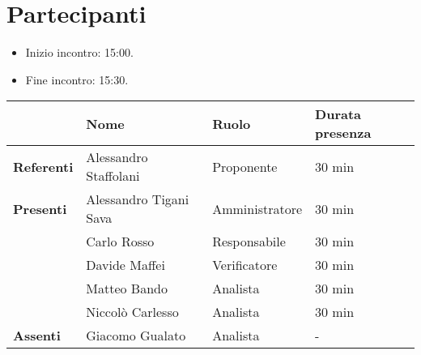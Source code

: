 \section*{Partecipanti}

\begin{itemize}
	\item Inizio incontro: 15:00.
	\item Fine incontro: 15:30.
\end{itemize}


\begin{center}
	{\renewcommand{\arraystretch}{1.5}
		\begin{tabular}{l|lll}
			                   & \textbf{Nome}          & \textbf{Ruolo} & \textbf{Durata presenza} \\
			\hline
			\textbf{Referenti} & Alessandro Staffolani  & Proponente     & 30 min                   \\
			\hline
			\textbf{Presenti}  & Alessandro Tigani Sava & Amministratore & 30 min                   \\
			                   & Carlo Rosso            & Responsabile   & 30 min                   \\
			                   & Davide Maffei          & Verificatore   & 30 min                   \\
			                   & Matteo Bando           & Analista       & 30 min                   \\
			                   & Niccolò Carlesso       & Analista       & 30 min                   \\
			\hline
			\textbf{Assenti}   & Giacomo Gualato        & Analista       & -                        \\
		\end{tabular}
	}
\end{center}
